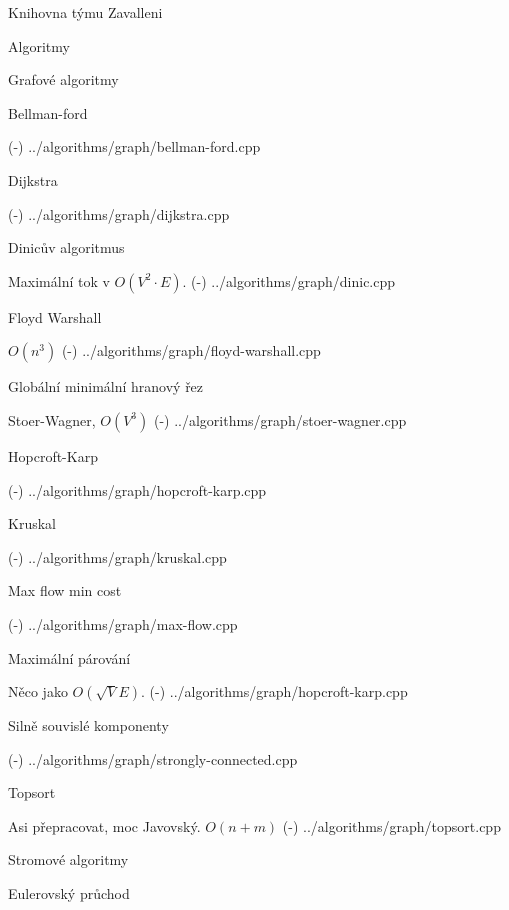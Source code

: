 
\chyph

\hyperlinks{\Blue}{\Green} %

\def\newpage{\vfil \break} %
\def\linebreak{\hfil \break} %
\overfullrule=0pt %
\def\tthook{\ttline=-2} %

\tit Knihovna týmu Zavalleni

\maketoc

\chap Algoritmy

\sec Grafové algoritmy 

\secc Bellman-ford 

\verbinput (-) ../algorithms/graph/bellman-ford.cpp

\secc Dijkstra 

\verbinput (-) ../algorithms/graph/dijkstra.cpp

\secc Dinicův algoritmus 

Maximální tok v $O(V^2 \cdot E)$.
\verbinput (-) ../algorithms/graph/dinic.cpp

\secc Floyd Warshall 

$O(n^3)$
\verbinput (-) ../algorithms/graph/floyd-warshall.cpp

\secc Globální minimální hranový řez 

Stoer-Wagner, $O(V^3)$
\verbinput (-) ../algorithms/graph/stoer-wagner.cpp

\secc Hopcroft-Karp 

\verbinput (-) ../algorithms/graph/hopcroft-karp.cpp

\secc Kruskal 

\verbinput (-) ../algorithms/graph/kruskal.cpp

\secc Max flow min cost

\verbinput (-) ../algorithms/graph/max-flow.cpp

\secc Maximální párování 

Něco jako $O(\sqrt{V}E)$.
\verbinput (-) ../algorithms/graph/hopcroft-karp.cpp

\secc Silně souvislé komponenty

\verbinput (-) ../algorithms/graph/strongly-connected.cpp

\secc Topsort 

Asi přepracovat, moc Javovský. $O(n + m)$
\verbinput (-) ../algorithms/graph/topsort.cpp

\sec Stromové algoritmy 

\secc Eulerovský průchod


